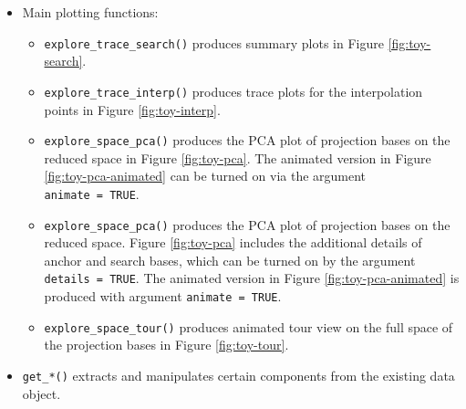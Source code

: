 \begin{itemize}
\item
  Main plotting functions:

  \begin{itemize}
  \tightlist
  \item
    \texttt{explore\_trace\_search()} produces summary plots in Figure
    \ref{fig:toy-search}.
  \item
    \texttt{explore\_trace\_interp()} produces trace plots for the
    interpolation points in Figure \ref{fig:toy-interp}.
  \item
    \texttt{explore\_space\_pca()} produces the PCA plot of projection
    bases on the reduced space in Figure \ref{fig:toy-pca}. The animated
    version in Figure \ref{fig:toy-pca-animated} can be turned on via
    the argument \texttt{animate\ =\ TRUE}.
  \item
    \texttt{explore\_space\_pca()} produces the PCA plot of projection
    bases on the reduced space. Figure \ref{fig:toy-pca} includes the
    additional details of anchor and search bases, which can be turned
    on by the argument \texttt{details\ =\ TRUE}. The animated version
    in Figure \ref{fig:toy-pca-animated} is produced with argument
    \texttt{animate\ =\ TRUE}.
  \item
    \texttt{explore\_space\_tour()} produces animated tour view on the
    full space of the projection bases in Figure \ref{fig:toy-tour}.
  \end{itemize}
\item
  \texttt{get\_*()} extracts and manipulates certain components from the
  existing data object.


\end{itemize}
